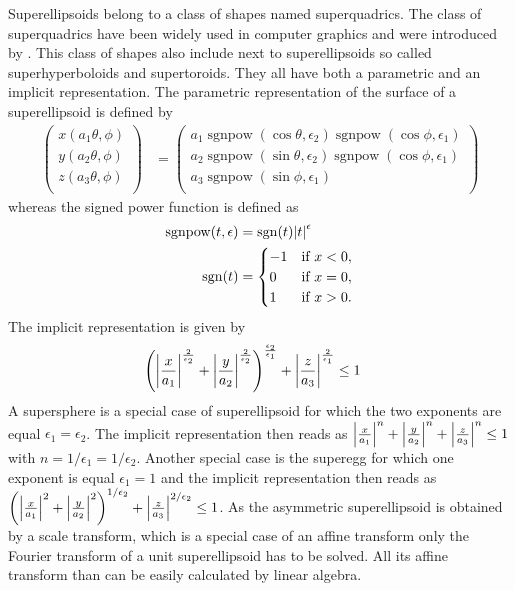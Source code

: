 Superellipsoids belong to a class of shapes named superquadrics. The class of superquadrics have been widely used in computer graphics and were introduced by \cite{Barr1981}. This class of shapes also include next to superellipsoids so called superhyperboloids and supertoroids. They all have both a
parametric and an implicit representation. The parametric representation of the surface of a superellipsoid is defined by
\begin{align}\label{eq:superellipsoid:parametric}
  \left(
    \begin{array}{c}
      x(a_1\theta,\phi) \\
      y(a_2\theta,\phi) \\
      z(a_3\theta,\phi) \\
    \end{array}
  \right)
 &=
 \left(
    \begin{array}{c}
     a_1 \operatorname{sgnpow}(\cos\theta,\epsilon_2)\operatorname{sgnpow}(\cos\phi,\epsilon_1)  \\
     a_2 \operatorname{sgnpow}(\sin\theta,\epsilon_2)\operatorname{sgnpow}(\cos\phi,\epsilon_1)  \\
     a_3 \operatorname{sgnpow}(\sin\phi,\epsilon_1) \\
    \end{array}
  \right)
\end{align}
whereas the signed power function is defined as
\begin{align}\label{eq:sgnpow}
  \operatorname{sgnpow}(t,\epsilon) &= \operatorname{sgn}(t){\left\vert t\right\vert}^\epsilon \\
  \operatorname{sgn}(t) &=
  \begin{cases}
    -1&{\text{if }}x<0,\\
     0&{\text{if }}x=0,\\
     1&{\text{if }}x>0.
  \end{cases}
\end{align}
The implicit representation is given by
\begin{align}\label{eq:superellipsoid:implicit}
\left(
     {\left\vert\frac{x}{a_1}\right\vert}^{\frac{2}{\epsilon_2}}+
     {\left\vert\frac{y}{a_2}\right\vert}^{\frac{2}{\epsilon_2}}
\right)^{\frac{\epsilon_2}{\epsilon_1}} +
{\left\vert\frac{z}{a_3}\right\vert}^{\frac{2}{\epsilon_1}} &\leq 1
\end{align}
A supersphere is a special case of superellipsoid for which the two exponents are equal $\epsilon_1=\epsilon_2$. The implicit representation then reads as
${\left\vert\frac{x}{a_1}\right\vert}^n+{\left\vert\frac{y}{a_2}\right\vert}^n+{\left\vert\frac{z}{a_3}\right\vert}^n\leq 1$ with $n=1/\epsilon_1=1/\epsilon_2$.
Another special case is the superegg for which one exponent is equal $\epsilon_1=1$ and the implicit representation then reads as
$\left({\left\vert\frac{x}{a_1}\right\vert}^2+{\left\vert\frac{y}{a_2}\right\vert}^2\right)^{1/\epsilon_2}+{\left\vert\frac{z}{a_3}\right\vert}^{2/\epsilon_2}\leq 1$.
As the asymmetric superellipsoid is obtained by a scale transform, which is a special case of an affine transform only the Fourier transform of a unit superellipsoid has to be solved. All its affine transform than can be easily calculated by linear algebra.


